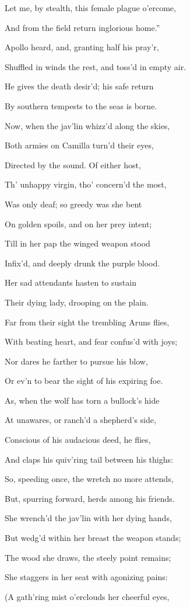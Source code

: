 Let me, by stealth, this female plague o’ercome,

And from the field return inglorious home.”

Apollo heard, and, granting half his pray’r,

Shuffled in winds the rest, and toss’d in empty air.

He gives the death desir’d; his safe return

By southern tempests to the seas is borne.

Now, when the jav’lin whizz’d along the skies,

Both armies on Camilla turn’d their eyes,

Directed by the sound. Of either host,

Th’ unhappy virgin, tho’ concern’d the most,

Was only deaf; so greedy was she bent

On golden spoils, and on her prey intent;

Till in her pap the winged weapon stood

Infix’d, and deeply drunk the purple blood.

Her sad attendants hasten to sustain

Their dying lady, drooping on the plain.

Far from their sight the trembling Aruns flies,

With beating heart, and fear confus’d with joys;

Nor dares he farther to pursue his blow,

Or ev’n to bear the sight of his expiring foe.

As, when the wolf has torn a bullock’s hide

At unawares, or ranch’d a shepherd’s side,

Conscious of his audacious deed, he flies,

And claps his quiv’ring tail between his thighs:

So, speeding once, the wretch no more attends,

But, spurring forward, herds among his friends.

She wrench’d the jav’lin with her dying hands,

But wedg’d within her breast the weapon stands;

The wood she draws, the steely point remains;

She staggers in her seat with agonizing pains:

(A gath’ring mist o’erclouds her cheerful eyes,

